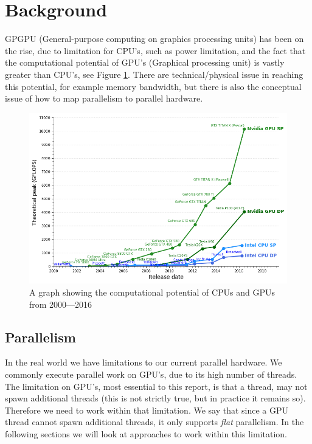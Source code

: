 \section{Background}
\label{BabyGotBack}
GPGPU (General-purpose computing on graphics processing units) has been on the rise, due to limitation for CPU's, such as power limitation, and the fact that the computational potential of GPU's (Graphical processing unit) is vastly greater than CPU's, see Figure \ref{potential}. There are technical/physical issue in reaching this potential, for example memory bandwidth, but there is also the conceptual issue of how to map parallelism to parallel hardware.
\begin{figure}[h]
\centering
\includegraphics[width=.8\textwidth]{resources/graf.png}
\caption{A graph showing the computational potential of CPUs and GPUs from 2000---2016 \cite{cpu-vs-gpu}}
\label{potential}
\end{figure}

\subsection{Parallelism} 
In the real world we have limitations to our current parallel hardware. We commonly execute parallel work on GPU's, due to its high number of threads. The limitation on GPU's, most essential to this report, is that a thread, may not spawn additional threads (this is not strictly true, but in practice it remains so). Therefore we need to work within that limitation. We say that since a GPU thread cannot spawn additional threads, it only supports \textit{flat} parallelism. In the following sections we will look at approaches to work within this limitation.    

